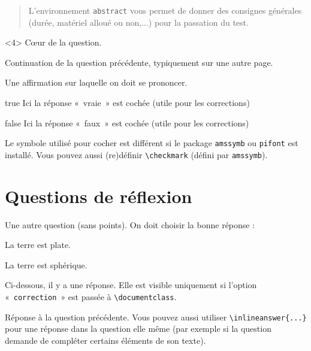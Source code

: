 \documentclass[12pt,a4paper, rulers%
]{tests}
\begin{document}
\begin{abstract}
  L'environnement \verb+abstract+ vous permet de donner des
  consignes générales (durée, matériel alloué ou non,...) pour la
  passation du test.
\end{abstract}


\begin{question}<4>
  Cœur de la question.
\end{question}

\begin{question*}
  Continuation de la question précédente, typiquement sur une autre
  page.
\end{question*}


\begin{question}
  \begin{TrueFalse}
  \item Une affirmation sur laquelle on doit se prononcer.
  \item[true] Ici la réponse «~vraie~» est cochée (utile pour les
    corrections)
  \item[false] Ici la réponse «~faux~» est cochée (utile pour les
    corrections)
  \end{TrueFalse}
  Le symbole utilisé pour cocher est différent si le package
  \verb+amssymb+ ou \verb+pifont+ est installé.  Vous pouvez aussi
  (re)définir \verb+\checkmark+ (défini par \verb+amssymb+).
\end{question}

\newpage

\part{Questions de réflexion}

\begin{question}
  Une autre question (sans points).  On doit choisir la bonne réponse :
  \begin{TrueFalse*}
  \item La terre est plate.
  \item La terre est sphérique.
  \end{TrueFalse*}
\end{question}

Ci-dessous, il y a une réponse.  Elle est visible uniquement si
l'option «~\verb+correction+~» est passée à \verb+\documentclass+.
\begin{answer}
  Réponse à la question précédente.  Vous pouvez aussi utiliser
  \verb+\inlineanswer{...}+ pour une réponse dans la question elle
  même (par exemple si la question demande de compléter certains
  éléments de son texte).
\end{answer}
\end{document}
